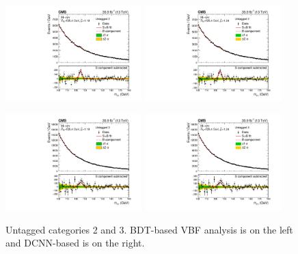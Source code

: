 \begin{figure}[h!]
    \begin{center}
        \includegraphics[width=0.47\textwidth]{figures/appendix_mass_plots/CMS-HIG-16-040_Figure_011-c.pdf}
        \includegraphics[width=0.47\textwidth]{figures/appendix_mass_plots/SBplots_jackWSnewOldTTHUntaggedTag_2_13TeV.pdf}
    \end{center}
    \begin{center}
        \includegraphics[width=0.47\textwidth]{figures/appendix_mass_plots/CMS-HIG-16-040_Figure_011-d.pdf}
        \includegraphics[width=0.47\textwidth]{figures/appendix_mass_plots/SBplots_jackWSnewOldTTHUntaggedTag_3_13TeV.pdf}
    \end{center}
    \caption{Untagged categories 2 and 3. BDT-based VBF analysis is on the left and DCNN-based is on the right.}
        \label{fig:app_mass_plots:unt_2_3}
\end{figure}






